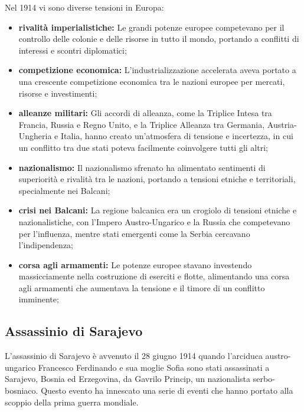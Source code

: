 \documentclass[a4paper]{article}
\begin{document}
Nel 1914 vi sono diverse tensioni in Europa:
\begin{itemize}
    \item \textbf{rivalità imperialistiche:} Le grandi potenze europee competevano per il controllo delle colonie e delle risorse in tutto il mondo, portando a conflitti di interessi e scontri diplomatici;
    \item \textbf{competizione economica:} L'industrializzazione accelerata aveva portato a una crescente competizione economica tra le nazioni europee per mercati, risorse e investimenti;
    \item \textbf{alleanze militari:} Gli accordi di alleanza, come la Triplice Intesa tra Francia, Russia e Regno Unito, e la Triplice Alleanza tra Germania, Austria-Ungheria e Italia, hanno creato un'atmosfera di tensione e incertezza, in cui un conflitto tra due stati poteva facilmente coinvolgere tutti gli altri;
    \item \textbf{nazionalismo:} Il nazionalismo sfrenato ha alimentato sentimenti di superiorità e rivalità tra le nazioni, portando a tensioni etniche e territoriali, specialmente nei Balcani;
    \item \textbf{crisi nei Balcani:} La regione balcanica era un crogiolo di tensioni etniche e nazionalistiche, con l'Impero Austro-Ungarico e la Russia che competevano per l'influenza, mentre stati emergenti come la Serbia cercavano l'indipendenza;
    \item \textbf{corsa agli armamenti:} Le potenze europee stavano investendo massicciamente nella costruzione di eserciti e flotte, alimentando una corsa agli armamenti che aumentava la tensione e il timore di un conflitto imminente;
\end{itemize}

\subsection{Assassinio di Sarajevo}

L'assassinio di Sarajevo è avvenuto il 28 giugno 1914
quando l'arciduca austro-ungarico Francesco Ferdinando e
sua moglie Sofia sono stati assassinati a Sarajevo,
Bosnia ed Erzegovina, da Gavrilo Princip,
un nazionalista serbo-bosniaco.
Questo evento ha innescato una serie di eventi che hanno portato alla
scoppio della prima guerra mondiale.
\end{document}

